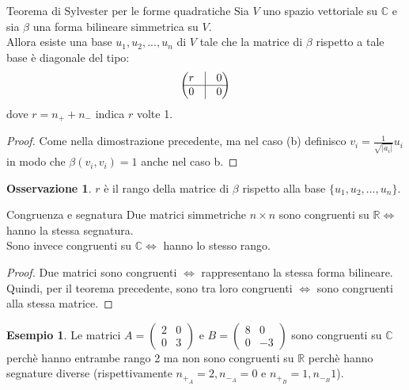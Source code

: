 \documentclass[a4paper]{article}
\theoremstyle{definition}
\newtheorem*{oss}{Osservazione}
\newtheorem*{es}{Esempio}
\begin{document}
	\begin{teo}{Teorema di Sylvester per le forme quadratiche}{}
		Sia $V$ uno spazio vettoriale su $\mathbb{C}$ e sia $\beta$ una forma bilineare simmetrica su $V$. \\
		Allora esiste una base $u_1, u_2, ..., u_n$ di $V$ tale che la matrice di $\beta$ rispetto a tale base è diagonale del tipo:
		\begin{align*}
			\begin{pmatrix}
				r & \vline & 0 \\
				\hline
				0 & \vline & 0
			\end{pmatrix}
		\end{align*}
		dove $r = n_+ + n_-$ indica $r$ volte 1.
	\end{teo}

	\begin{proof}
		Come nella dimostrazione precedente, ma nel caso (b) definisco $v_i = \frac{1}{\sqrt{|a_i|}}u_i$ in modo che $\beta(v_i, v_i) = 1$ anche nel caso b.
	\end{proof}

	\begin{oss}
		$r$ è il rango della matrice di $\beta$ rispetto alla base $\{u_1, u_2, ..., u_n\}$.
	\end{oss}

	\begin{cor}{Congruenza e segnatura}{}
		Due matrici simmetriche $n \times n$ sono congruenti su $\mathbb{R} \Leftrightarrow$ hanno la stessa segnatura. \\
		Sono invece congruenti su $\mathbb{C} \Leftrightarrow$ hanno lo stesso rango.
	\end{cor}

	\begin{proof}
		Due matrici sono congruenti $\Leftrightarrow$ rappresentano la stessa forma bilineare. \\
		Quindi, per il teorema precedente, sono tra loro congruenti $\Leftrightarrow$ sono congruenti alla stessa matrice.
	\end{proof}

	\begin{es}
		Le matrici $A = \begin{pmatrix}
			2 & 0 \\
			0 & 3
		\end{pmatrix}$ e $B = \begin{pmatrix}
			8 & 0 \\
			0 & -3
		\end{pmatrix}$ sono congruenti su $\mathbb{C}$ perchè hanno entrambe rango 2
		ma non sono congruenti su $\mathbb{R}$ perchè hanno segnature diverse (rispettivamente $n_{+_A} = 2, n_{-_A} = 0$ e $n_{+_B} = 1, n_{-_B} 1$).
	\end{es}
\end{document}
